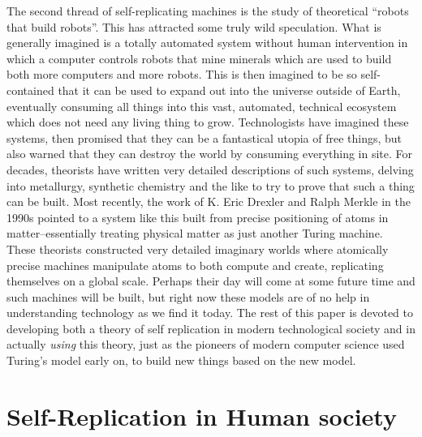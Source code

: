 \documentclass[12pt,a4paper]{amsart}
\numberwithin{equation}{section}
\begin{document}
The second thread of self-replicating machines is the study of
theoretical ``robots that build robots''. This has attracted some truly
wild speculation. What is generally imagined is a totally automated
system without human intervention in which a computer controls robots
that mine minerals which are used to build both more computers and more
robots. This is then imagined to be so self-contained that it can be
used to expand out into the universe outside of Earth, eventually
consuming all things into this vast, automated, technical ecosystem
which does not need any living thing to grow. Technologists have
imagined these systems, then promised that they can be a fantastical
utopia of free things, but also warned that they can destroy the world
by consuming everything in site. For decades, theorists have written
very detailed descriptions of such systems, delving into metallurgy,
synthetic chemistry and the like to try to prove that such a thing can
be built. Most recently, the work of K. Eric Drexler and Ralph Merkle in
the 1990s pointed to a system like this built from precise positioning
of atoms in matter--essentially treating physical matter as just another
Turing machine. These theorists constructed very detailed imaginary
worlds where atomically precise machines manipulate atoms to both
compute and create, replicating themselves on a global scale. Perhaps
their day will come at some future time and such machines will be built,
but right now these models are of no help in understanding technology as
we find it today. The rest of this paper is devoted to developing both a
theory of self replication in modern technological society and in
actually \emph{using} this theory, just as the pioneers of modern
computer science used Turing's model early on, to build new things based
on the new model.

\section{Self-Replication in Human
society}\label{self-replication-in-human-society}
\end{document}
